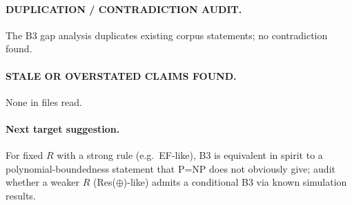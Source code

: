 \documentclass{article}
\begin{document}
\paragraph{DUPLICATION / CONTRADICTION AUDIT.} The B3 gap analysis duplicates existing corpus statements; no contradiction found.
\paragraph{STALE OR OVERSTATED CLAIMS FOUND.} None in files read.
\paragraph{Next target suggestion.} For fixed $R$ with a strong rule (e.g.\ EF-like), B3 is equivalent in spirit to a polynomial-boundedness statement that P=NP does not obviously give; audit whether a weaker $R$ (Res($\oplus$)-like) admits a conditional B3 via known simulation results.

\end{document}
